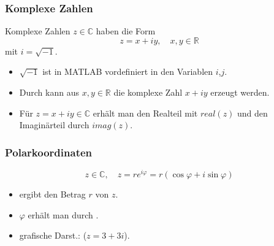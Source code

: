 \documentclass[hyperref={xetex}]{beamer}
\begin{document}
%
%
\begin{frame}[fragile]\frametitle{Komplexe Zahlen}
Komplexe Zahlen $z \in \mathbb{C}$ haben die Form
\[ z = x +iy, \quad x,y \in \mathbb{R} \]
mit $i=\sqrt{-1}$. 
\begin{itemize}
\item $\sqrt{-1}$ ist in MATLAB vordefiniert in den Variablen $i$,$j$.
\item Durch   kann aus $x,y \in
  \mathbb{R}$ die komplexe Zahl $x + iy$ erzeugt werden.
\item Für $z=x+iy \in \mathbb{C}$ erhält man den Realteil mit
  $real(z)$ und den Imaginärteil durch $imag(z)$. 
\end{itemize} 
\end{frame}
\begin{frame}[fragile]\frametitle{Polarkoordinaten}
\alert{ \[ z \in \mathbb{C}, \quad z=re^{i \varphi}=r(\cos \varphi + i \sin
  \varphi) \]}
\begin{itemize}
\item {} ergibt den Betrag $r$ von $z$.
\item $\varphi$ erhält man durch .
\item grafische Darst.:   ($z=3+3i$). \\
 \\ 
\end{itemize}
\end{frame}
\end{document}

